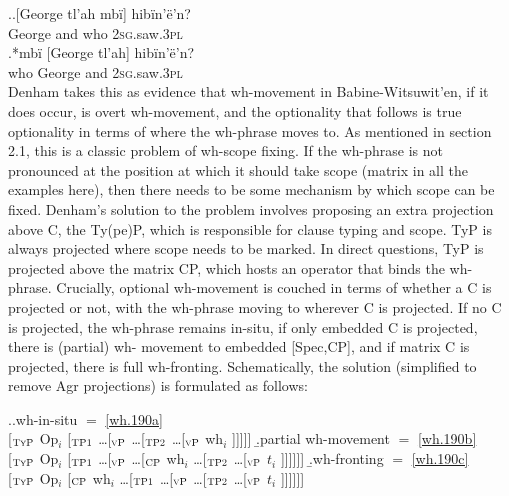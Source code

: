 \documentclass[charis]{glossa}
\begin{document}
\ex.\label{wh.230}\ag.{}[George tl'ah mb\"i] hib\"in'\"e'n?\\
   George and who \textsc{2sg}.saw.\textsc{3pl}\\
   \bg.*mb\"i [George tl'ah] hib\"in'\"e'n?\\
   who George and \textsc{2sg}.saw.\textsc{3pl}\\

Denham takes this as evidence that wh-movement in Babine-Witsuwit'en, if it does occur, is overt wh-movement, and the optionality that follows is true optionality in terms of where the wh-phrase moves to. As mentioned in section 2.1, this is a classic problem of wh-scope fixing. If the wh-phrase is not pronounced at the position at which it should take scope (matrix in all the examples here), then there needs to be some mechanism by which scope can be fixed. Denham's solution to the problem involves proposing an extra projection above C, the Ty(pe)P, which is responsible for clause typing and scope. TyP is always projected where scope needs to be marked. In direct questions, TyP is projected above the matrix CP, which hosts an operator that binds the wh-phrase. Crucially, optional wh-movement is couched in terms of whether a C is projected or not, with the wh-phrase moving to wherever C is projected. If no C is projected, the wh-phrase remains in-situ, if only embedded C is projected, there is (partial) wh- movement to embedded [Spec,CP], and if matrix C is projected, there is full wh-fronting. Schematically, the solution (simplified to remove Agr projections) is formulated as follows:

\ex.\a.\label{wh.240a}wh-in-situ $=$ \ref{wh.190a}\\{}[$_{\textsc{TyP}}$ Op$_i$ [$_{\textsc{TP1}}$ \dots [$_{\textsc{vP}}$ \dots [$_{\textsc{TP2}}$ \dots [$_{\textsc{vP}}$ wh$_i$ ]]]]]\hspace{\fill}
   \b.\label{wh.240b}partial wh-movement $=$ \ref{wh.190b}\\{}[$_{\textsc{TyP}}$ Op$_i$ [$_{\textsc{TP1}}$ \dots [$_{\textsc{vP}}$ \dots [$_{\textsc{CP}}$ wh$_i$ \dots [$_{\textsc{TP2}}$ \dots [$_{\textsc{vP}}$ $t_i$ ]]]]]]\hspace{\fill}
   \b.\label{wh.240c}wh-fronting $=$ \ref{wh.190c}\\{}[$_{\textsc{TyP}}$ Op$_i$ [$_{\textsc{CP}}$ wh$_i$ \dots [$_{\textsc{TP1}}$ \dots [$_{\textsc{vP}}$ \dots [$_{\textsc{TP2}}$ \dots [$_{\textsc{vP}}$ $t_i$ ]]]]]]\hspace{\fill}\hspace{\fill}
\end{document}
